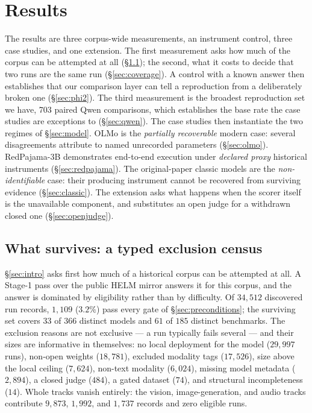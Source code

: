 \section{Results}
\label{sec:cases}

The results are three corpus-wide measurements, an instrument control, three case
studies, and one extension. The first measurement asks how much of the corpus can
be attempted at all (\S\ref{sec:census}); the second, what it costs to decide that
two runs are the same run (\S\ref{sec:coverage}). A control with a known answer
then establishes that our comparison layer can tell a reproduction from a
deliberately broken one (\S\ref{sec:phi2}). The third measurement is the broadest
reproduction set we
have, 703 paired Qwen comparisons, which establishes the base rate the case
studies are exceptions to (\S\ref{sec:qwen}). The case studies then instantiate
the two regimes of \S\ref{sec:model}. OLMo is
the \emph{partially recoverable} modern case: several disagreements attribute to
named unrecorded parameters (\S\ref{sec:olmo}). RedPajama-3B demonstrates
end-to-end execution under \emph{declared proxy} historical instruments
(\S\ref{sec:redpajama}). The original-paper classic models are the
\emph{non-identifiable} case: their producing instrument cannot be recovered from
surviving evidence (\S\ref{sec:classic}). The extension asks what happens when the
scorer itself is the unavailable component, and substitutes an open judge for a
withdrawn closed one (\S\ref{sec:openjudge}).

\subsection{What survives: a typed exclusion census}
\label{sec:census}

\S\ref{sec:intro} asks first how much of a historical corpus can be attempted at
all. A Stage-1 pass over the public HELM mirror answers it for this corpus, and
the answer is dominated by eligibility rather than by difficulty. Of $34{,}512$
discovered run records, $1{,}109$ ($3.2\%$) pass every gate of
\S\ref{sec:preconditions}; the surviving set covers $33$ of $366$ distinct models
and $61$ of $185$ distinct benchmarks. The exclusion reasons are not exclusive ---
a run typically fails several --- and their sizes are informative in themselves:
no local deployment for the model ($29{,}997$ runs), non-open weights ($18{,}781$),
excluded modality tags ($17{,}526$), size above the local ceiling ($7{,}624$),
non-text modality ($6{,}024$), missing model metadata ($2{,}894$), a closed judge
($484$), a gated dataset ($74$), and structural incompleteness ($14$). Whole
tracks vanish entirely: the vision, image-generation, and audio tracks contribute
$9{,}873$, $1{,}992$, and $1{,}737$ records and zero eligible runs.


